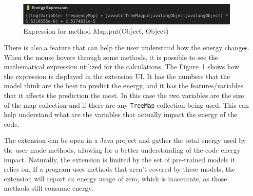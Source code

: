\begin{figure}[htbp]
  \centering
  \includegraphics[width = .8 \textwidth]{figures/extension_expression_example.png}
  \caption{Expression for method Map.put(Object, Object)}
  \label{fig:extension_expression_example}
\end{figure}

There is also a feature that can help the user understand how the energy changes. When the mouse hovers through some methods, it is possible to see the mathematical expression utilized for the calculations. The Figure~\ref{fig:extension_expression_example} shows how the expression is displayed in the extension UI. It has the numbers that the model think are the best to predict the energy, and it has the features/variables that it affects the prediction the most. In this case the two variables are the size of the map collection and if there are any \texttt{TreeMap} collection being used. This can help understand what are the variables that actually impact the energy of the code. 

The extension can be open in a Java project and gather the total energy used by the user made methods, allowing for a better understanding of the code energy impact. Naturally, the extension is limited by the set of pre-trained models it relies on. If a program uses methods that aren't covered by these models, the extension will report an energy usage of zero, which is inaccurate, as those methods still consume energy.